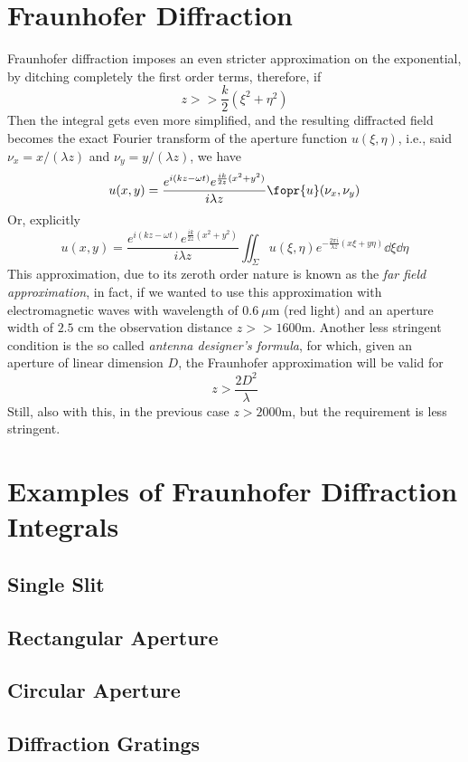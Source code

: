 \documentclass[../electromagnetism.tex]{subfiles}
\begin{document}
\section{Fraunhofer Diffraction}
Fraunhofer diffraction imposes an even stricter approximation on the exponential, by ditching completely the first order terms, therefore, if
\begin{equation}
	z>>\frac{k}{2}\left( \xi^2+\eta^2 \right)
	\label{eq:fraunhoferregime.fraun}
\end{equation}
Then the integral gets even more simplified, and the resulting diffracted field becomes the exact Fourier transform of the aperture function $u(\xi,\eta)$, i.e., said $\nu_x=x/(\lambda z)$ and $\nu_y=y/(\lambda z)$, we have
\begin{equation*}
	u(x,y)=\frac{e^{i(kz-\omega t)}e^{\frac{ik}{2z}(x^2+y^2)}}{i\lambda z}\fopr{u}(\nu_x,\nu_y)
\end{equation*}
Or, explicitly
\begin{equation}
	u(x,y)=\frac{e^{i(kz-\omega t)}e^{\frac{ik}{2z}(x^2+y^2)}}{i\lambda z}\iint_{\Sigma}u(\xi,\eta)e^{-\frac{2\pi i}{\lambda z}\left( x\xi+y\eta \right)}\dd{\xi}\dd{\eta}
	\label{eq:fraunhoferint.fraun}
\end{equation}
This approximation, due to its zeroth order nature is known as the \textit{far field approximation}, in fact, if we wanted to use this approximation with electromagnetic waves with wavelength of $0.6\ \mu$m (red light) and an aperture width of $2.5$ cm the observation distance $z>>1600$m. Another less stringent condition is the so called \textit{antenna designer's formula}, for which, given an aperture of linear dimension $D$, the Fraunhofer approximation will be valid for
\begin{equation}
	z>\frac{2D^2}{\lambda}
	\label{eq:antennista.fraun}
\end{equation}
Still, also with this, in the previous case $z>2000$m, but the requirement is less stringent.
\section{Examples of Fraunhofer Diffraction Integrals}
\subsection{Single Slit}
\subsection{Rectangular Aperture}
\subsection{Circular Aperture}
\subsection{Diffraction Gratings}
\end{document}
